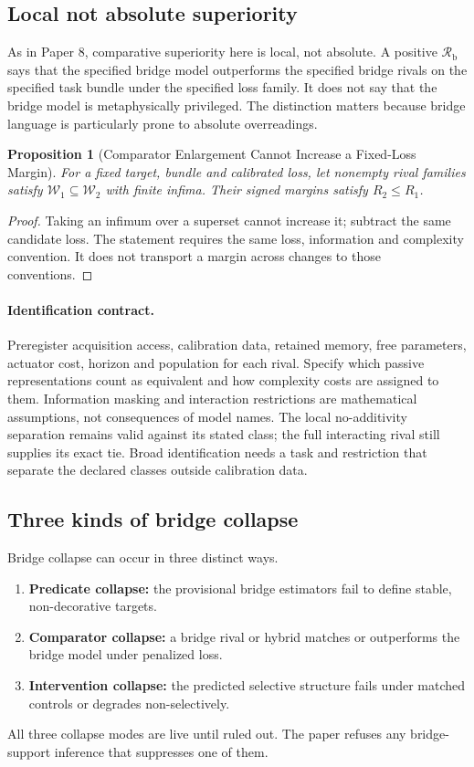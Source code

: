 \documentclass[11pt,a4paper]{article}
\newtheorem{proposition}[theorem]{Proposition}
\theoremstyle{definition}
\newcommand{\BridgeMargin}{\mathcal{R}_{\mathrm{b}}}
\begin{document}
\subsection{Local not absolute superiority}
As in Paper 8, comparative superiority here is local, not absolute. A positive $\BridgeMargin$ says that the specified bridge model outperforms the specified bridge rivals on the specified task bundle under the specified loss family. It does not say that the bridge model is metaphysically privileged. The distinction matters because bridge language is particularly prone to absolute overreadings.

\begin{proposition}[Comparator Enlargement Cannot Increase a Fixed-Loss Margin]\label{prop:rival-family-monotonicity}
For a fixed target, bundle and calibrated loss, let nonempty rival families satisfy $\mathcal W_1\subseteq\mathcal W_2$ with finite infima. Their signed margins satisfy $R_2\le R_1$.
\end{proposition}
\begin{proof}
Taking an infimum over a superset cannot increase it; subtract the same candidate loss. The statement requires the same loss, information and complexity convention. It does not transport a margin across changes to those conventions.
\end{proof}
\paragraph{Identification contract.}
Preregister acquisition access, calibration data, retained memory, free parameters, actuator cost, horizon and population for each rival. Specify which passive representations count as equivalent and how complexity costs are assigned to them. Information masking and interaction restrictions are mathematical assumptions, not consequences of model names. The local no-additivity separation remains valid against its stated class; the full interacting rival still supplies its exact tie. Broad identification needs a task and restriction that separate the declared classes outside calibration data.

\subsection{Three kinds of bridge collapse}
Bridge collapse can occur in three distinct ways.
\begin{enumerate}[leftmargin=1.5em]
\item \textbf{Predicate collapse:} the provisional bridge estimators fail to define stable, non-decorative targets.
\item \textbf{Comparator collapse:} a bridge rival or hybrid matches or outperforms the bridge model under penalized loss.
\item \textbf{Intervention collapse:} the predicted selective structure fails under matched controls or degrades non-selectively.
\end{enumerate}
All three collapse modes are live until ruled out. The paper refuses any bridge-support inference that suppresses one of them.
\end{document}
